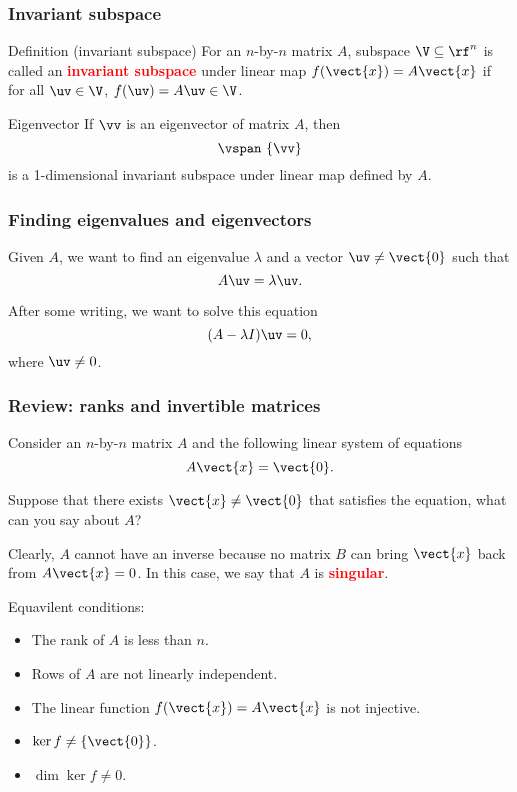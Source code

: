 \begin{frame}
  \frametitle{Invariant subspace}

  \begin{block}{Definition (invariant subspace)}
    For an $n$-by-$n$ matrix $A$, subspace $\V\subseteq \rf^n$ is
    called an \textcolor{red}{\bf invariant subspace} under linear map
    $f(\vect{x})=A\vect{x}$ if for all $\uv\in \V$, $f(\uv)=A\uv\in\V$.
  \end{block}

  \pause
  \begin{block}{Eigenvector}
    If $\vv$ is an eigenvector of matrix $A$, then
    \[
    \vspan~\{\vv\}
    \]
    is a 1-dimensional invariant subspace under linear map defined by
    $A$.
  \end{block}

\end{frame}

\begin{frame}
  \frametitle{Finding eigenvalues and eigenvectors}

  Given $A$, we want to find an eigenvalue $\lambda$ and a vector
  $\uv\neq\vect{0}$ such that
  \[
  A\uv = \lambda\uv.
  \]
  
  \pause
  After some writing, we want to solve this equation
  \[
  (A - \lambda I)\uv = 0,
  \]
  where $\uv\neq 0$.
  
\end{frame}

\begin{frame}
  \frametitle{Review: ranks and invertible matrices}

  Consider an $n$-by-$n$ matrix $A$ and the following linear system of
  equations
  \[
  A\vect{x} = \vect{0}.
  \]

  \pause
  Suppose that there exists $\vect{x}\neq\vect{0}$ that satisfies the
  equation, what can you say about $A$?

  \pause Clearly, $A$ cannot have an inverse because no matrix $B$ can
  bring $\vect{x}$ back from $A\vect{x}=0$. \pause In this case, we
  say that $A$ is \textcolor{red}{\bf singular}.

  \pause
  \pause Equavilent conditions:
  \begin{itemize}
  \item The rank of $A$ is less than $n$.
  \item Rows of $A$ are not linearly independent.
  \item The linear function $f(\vect{x})=A\vect{x}$ is not injective.
  \item $\ker f\neq\{\vect{0}\}$.
  \item $\dim \ker f\neq 0$.
  \end{itemize}
\end{frame}

